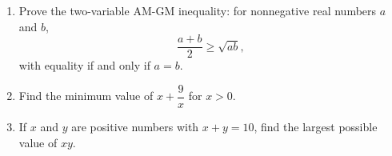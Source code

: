 \begin{enumerate}
\item[(a)] Prove the two-variable AM-GM inequality: for nonnegative real numbers $a$ and $b$,
\[\dfrac{a+b}{2}\ge\sqrt{ab},\]
with equality if and only if $a=b$.
\item[(b)] Find the minimum value of $x+\dfrac9x$ for $x>0$.
\item[(c)] If $x$ and $y$ are positive numbers with $x+y=10$, find the largest possible value of $xy$.
\end{enumerate}
